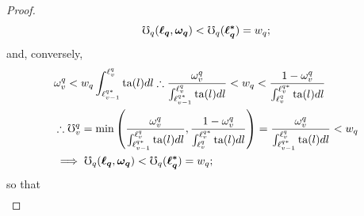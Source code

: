 \documentclass[hidelinks, nonatbib]{elsarticle}
\begin{document}
\begin{lemma}
\begin{proof}
\begin{align}
            \mho_{q}(
                \boldsymbol{\ell_q}
                ,\boldsymbol{\omega_q}
            ) 
            <
            \mho_{q}(
                \boldsymbol{\ell_{q}^{*}}
            )
            =
            w_q
            ;
        \end{align}
        and, conversely, 
        \begin{align}
            &
            \omega_{v}^{q} < 
            w_q
            \int_{
                \ell_{v-1}^{q*}
            }^{
                \ell_{v}^{q}
            }{
                \text{ta}(l)dl
            }
            \therefore
            \frac{
                \omega_{v}^{q}
            }{
                \int_{
                    \ell_{v-1}^{q*}
                }^{
                    \ell_{v}^{q}
                }
                \text{ta}(l)dl
            }
            < 
            w_q
            <
            \frac{
                1-\omega_{v}^{q}
            }{
                \int_{
                    \ell_{v}^{q}
                }^{
                    \ell_{v}^{q*}
                }
                \text{ta}(l)dl
            }
            \\
            &\therefore
            \mho_{v}^{q} = 
            \min\left(
                \frac{
                    \omega_{v}^{q}
                }{
                    \int_{
                        \ell_{v-1}^{q*}
                    }^{
                        \ell_{v}^{q}
                    }
                    \text{ta}(l)dl
                }
                ,
                \frac{
                    1-\omega_{v}^{q}
                }{
                    \int_{
                        \ell_{v}^{q}
                    }^{
                        \ell_{v}^{q*}
                    }
                    \text{ta}(l)dl
                }
            \right)
            =
            \frac{
                \omega_{v}^{q}
            }{
                \int_{
                    \ell_{v-1}^{q*}
                }^{
                    \ell_{v}^{q}
                }
                \text{ta}(l)dl
            }
            <
            w_q
            \\
            &\implies
            \mho_{q}(
                \boldsymbol{\ell_q}
                ,\boldsymbol{\omega_q}
            ) 
            <
            \mho_{q}(
                \boldsymbol{\ell_{q}^{*}}
            )
            =
            w_q
            ;
        \end{align}
        so that 
        \begin{gather}

\end{gather}
\end{proof}
\end{lemma}
\end{document}
